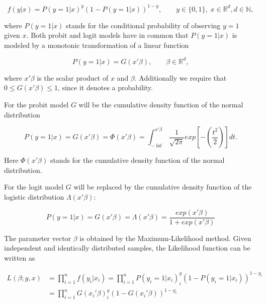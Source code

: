 \documentclass{article}
\begin{document}
\begin{equation}
f(y|x) = P(y=1|x)^y\left(1-P(y=1|x)\right)^{1-y},\qquad y\in \{0,1\},\; x\in \mathbb{R}^d, d \in \mathbb{N},
\end{equation}

where $P(y=1|x)$ stands for the conditional probability of observing $y=1$ given $x$. Both probit and logit models have in common that $P(y=1|x)$ is modeled by a monotonic transformation of a linear function

\begin{equation}
P(y=1|x) = G(x \prime \beta), \qquad \beta \in \mathbb{R}^d,
\end{equation}

where $x \prime \beta$ is the scalar product of $x$ and $\beta$. Additionally we require that $0 \leq G(x \prime \beta) \leq 1$, since it denotes a probability.

For the probit model $G$ will be the cumulative density function of the normal distribution

\begin{equation}
P(y=1|x) = G(x \prime \beta) = \Phi(x \prime \beta) = \int_{-\inf}^{x \prime \beta} \frac{1}{\sqrt{2\pi}}exp\left[-(\frac{t^2}{2})\right]dt.
\end{equation}

Here $\Phi(x \prime \beta)$ stands for the cumulative density function of the normal distribution.

For the logit model $G$ will be replaced by the cumulative density function of the logistic distribution $\Lambda(x \prime \beta)$:

\begin{equation}
P(y=1|x) = G(x \prime \beta) = \Lambda(x \prime \beta) = \frac{exp(x \prime \beta)}{1+exp(x \prime \beta)}
\end{equation}

The parameter vector $\beta$ is obtained by the Maximum-Likelihood method. Given independent and identically distributed samples, the Likelihood function can be written as

\begin{equation}
\begin{split}
L(\beta;y, x) &= \prod_{i=1}^{n} f(y_i | x_i)
              =\prod_{i=1}^{n} P(y_i=1|x_i)^y_i\left(1-P(y_i=1|x_i)\right)^{1-y_i} \\
            & =\prod_{i=1}^{n} G(x_i\prime \beta)^y_i\left(1-G(x_i\prime \beta)\right)^{1-y_i}
\end{split}
\end{equation}
\end{document}
